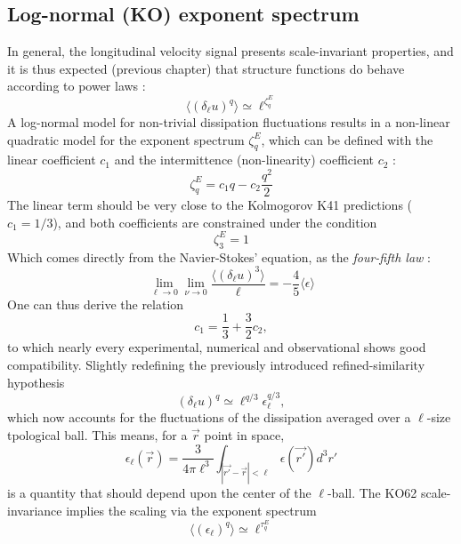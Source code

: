 \subsection{Log-normal (KO) exponent spectrum}
In general, the longitudinal velocity signal presents scale-invariant properties, and it is thus expected (previous chapter) that structure functions do behave according to power laws :
\begin{equation}
    \langle(\delta_\ell u)^q\rangle\simeq\ell^{\zeta_q^E}
\end{equation}
A log-normal model for non-trivial dissipation fluctuations results in a non-linear quadratic model for the exponent spectrum $\zeta_q^E$, which can be defined with the linear coefficient $c_1$ and the intermittence (non-linearity) coefficient $c_2$ :
\begin{equation}
    \zeta_q^E=c_1q-c_2\frac{q^2}{2}
\end{equation}
The linear term should be very close to the Kolmogorov K41 predictions ($c_1=1/3$), and both coefficients are constrained under the condition 
\begin{equation}
    \zeta_3^E=1
\end{equation}
Which comes directly from the Navier-Stokes' equation, as the \emph{four-fifth law} :
\begin{equation}
    \lim_{\ell\rightarrow0}\lim_{\nu\rightarrow0}\frac{\langle(\delta_\ell u)^3\rangle}{\ell}=-\frac{4}{5}\langle\epsilon\rangle
\end{equation}
One can thus derive the relation
\begin{equation}
    c_1=\frac{1}{3}+\frac{3}{2}c_2,
\end{equation}
to which nearly every experimental, numerical and observational shows good compatibility. 
Slightly redefining the previously introduced refined-similarity hypothesis 
\begin{equation}
    (\delta_\ell u)^q\simeq\ell^{q/3}\epsilon_\ell^{q/3},
\end{equation}
which now accounts for the fluctuations of the dissipation averaged over a $\ell$-size tpological ball. This means, for a $\vec{r}$ point in space,
\begin{equation}
    \epsilon_\ell(\vec{r})=\frac{3}{4\pi\ell^3}\int_{|\vec{r'}-\vec{r}|<\ell}\epsilon(\vec{r'})d^3r'
\end{equation}
is a quantity that should depend upon the center of the $\ell$-ball. The KO62 scale-invariance implies the scaling via the exponent spectrum 
\begin{equation}
    \langle(\epsilon_\ell)^q\rangle\simeq\ell^{\tau_q^E}
\end{equation}
